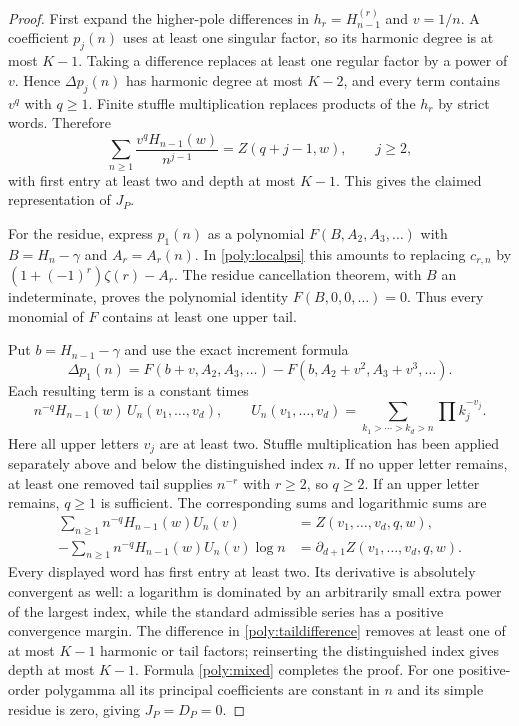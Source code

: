 \documentclass[11pt,a4paper]{article}
\numberwithin{equation}{section}
\theoremstyle{definition}
\theoremstyle{remark}
\begin{document}
\begin{proof}
First expand the higher-pole differences in
$h_r=H_{n-1}^{(r)}$ and $v=1/n$. A coefficient $p_j(n)$ uses at
least one singular factor, so its harmonic degree is at most $K-1$.
Taking a difference replaces at least one regular factor by a power
of $v$. Hence $\Delta p_j(n)$ has harmonic degree at most $K-2$,
and every term contains $v^q$ with $q\ge1$.
Finite stuffle multiplication replaces products of the $h_r$ by strict
words. Therefore
\[
 \sum_{n\ge1}\frac{v^q H_{n-1}(w)}{n^{j-1}}
 =Z(q+j-1,w),\qquad j\ge2,
\]
with first entry at least two and depth at most $K-1$.
This gives the claimed representation of $J_P$.

For the residue, express $p_1(n)$ as a polynomial
$F(B,A_2,A_3,\ldots)$ with $B=H_n-\gamma$ and
$A_r=A_r(n)$. In \eqref{poly:localpsi} this amounts to replacing
$c_{r,n}$ by $(1+(-1)^r)\zeta(r)-A_r$.
The residue cancellation theorem, with $B$ an indeterminate, proves
the polynomial identity $F(B,0,0,\ldots)=0$. Thus every monomial
of $F$ contains at least one upper tail.

Put $b=H_{n-1}-\gamma$ and use the exact increment formula
\begin{equation}\label{poly:taildifference}
 \Delta p_1(n)=F(b+v,A_2,A_3,\ldots)
       -F(b,A_2+v^2,A_3+v^3,\ldots).
\end{equation}
Each resulting term is a constant times
\begin{equation}\label{poly:splitword}
 n^{-q}H_{n-1}(w)\,U_n(v_1,\ldots,v_d),\qquad
 U_n(v_1,\ldots,v_d)=
 \sum_{k_1>\cdots>k_d>n}\prod k_j^{-v_j}.
\end{equation}
Here all upper letters $v_j$ are at least two. Stuffle multiplication
has been applied separately above and below the distinguished index $n$.
If no upper letter remains, at least one removed tail supplies
$n^{-r}$ with $r\ge2$, so $q\ge2$. If an upper letter remains,
$q\ge1$ is sufficient. The corresponding sums and logarithmic sums are
\begin{align}
 \sum_{n\ge1}n^{-q}H_{n-1}(w)U_n(v)
     &=Z(v_1,\ldots,v_d,q,w),\label{poly:concatenate}\\
 -\sum_{n\ge1}n^{-q}H_{n-1}(w)U_n(v)\log n
     &=\partial_{d+1}Z(v_1,\ldots,v_d,q,w).
 \label{poly:concatenateD}
\end{align}
Every displayed word has first entry at least two. Its derivative is
absolutely convergent as well: a logarithm is dominated by an arbitrarily
small extra power of the largest index, while the standard admissible
series has a positive convergence margin.
The difference in \eqref{poly:taildifference} removes at least one of
at most $K-1$ harmonic or tail factors; reinserting the distinguished
index gives depth at most $K-1$. Formula \eqref{poly:mixed} completes
the proof. For one positive-order polygamma all its principal coefficients
are constant in $n$ and its simple residue is zero, giving $J_P=D_P=0$.
\end{proof}
\end{document}
